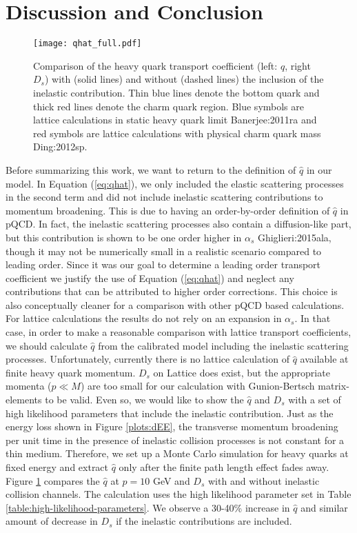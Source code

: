 \section{Discussion and Conclusion}\label{section:conclusion}
\begin{figure}
\texttt{[image: qhat\_full.pdf]}
\caption{Comparison of the heavy quark transport coefficient (left: $\hat{q}$, right $D_s$) with (solid lines) and without (dashed lines) the inclusion of the inelastic contribution. Thin blue lines denote the bottom quark and thick red lines denote the charm quark region. Blue symbols are lattice calculations in static heavy quark limit {Banerjee:2011ra} and red symbols are lattice calculations with physical charm quark mass {Ding:2012sp}.}\label{plots:transport_full}
\end{figure}
Before summarizing this work, we want to return to the definition of $\hat{q}$ in our model.
In Equation (\ref{eq:qhat}), we  only included the elastic scattering processes in the second term and did not include inelastic scattering contributions to momentum broadening.
This is due to having an order-by-order definition of $\hat{q}$ in pQCD.
In fact, the inelastic scattering processes also contain a diffusion-like part, but this contribution is shown to be one order higher in $\alpha_s$ {Ghiglieri:2015ala}, though it may not be numerically small in a realistic scenario compared to leading order.
Since it was our goal to determine a leading order transport coefficient we justify the use of Equation (\ref{eq:qhat}) and neglect any contributions that can be attributed to higher order corrections. 
This choice is also conceptually cleaner for a comparison with other pQCD based calculations.
For lattice calculations the results do not rely on an expansion in $\alpha_s$.
In that case, in order to make a reasonable comparison with lattice transport coefficients, we should calculate $\hat{q}$ from the calibrated model including the inelastic scattering processes.
Unfortunately, currently there is no lattice calculation of $\hat{q}$ available at finite heavy quark momentum.  
$D_s$ on Lattice does exist, but the appropriate momenta ($p \ll M$) are too small for our calculation with Gunion-Bertsch matrix-elements to be valid.
Even so, we would like to show the $\hat{q}$ and $D_s$ with a set of high likelihood parameters that include the inelastic contribution.
Just as the energy loss shown in Figure \ref{plots:dEE}, the transverse momentum broadening per unit time in the presence of inelastic collision processes is not constant for a thin medium.
Therefore, we set up a Monte Carlo simulation for heavy quarks at fixed energy  and extract $\hat{q}$ only after the finite path length effect fades away. 
Figure \ref{plots:transport_full} compares the $\hat{q}$ at $p=10$ GeV and $D_s$ with and without inelastic collision channels.
The calculation uses the high likelihood parameter set in Table \ref{table:high-likelihood-parameters}. 
We observe a 30-40\% increase in $\hat{q}$ and similar amount of decrease in $D_s$ if the inelastic contributions are included.

